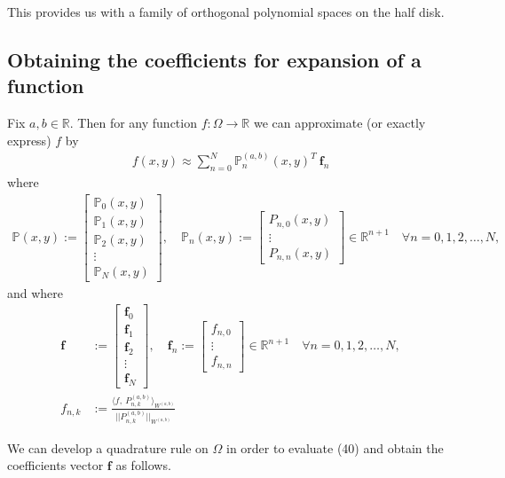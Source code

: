\documentclass[11pt, oneside]{article}   	%
\newcommand{\R}{\mathbb{R}}
\newcommand{\bigP}{\mathbb{P}}
\newcommand{\Pnk}{P_{n,k}}
\begin{document}
This provides us with a family of orthogonal polynomial spaces on the half disk.


\subsection{Obtaining the coefficients for expansion of a function}

Fix \(a,b \in \R\). Then for any function \(f : \Omega \to \R\) we can approximate (or exactly express) \(f\) by
\begin{align}
f(x,y) \approx \sum_{n=0}^N \bigP_n^{(a,b)}(x,y)^T \: \mathbf{f}_n
\end{align}
where
\begin{align}
\bigP(x,y) := \begin{bmatrix}
		\bigP_0(x,y) \\
		\hline
		\bigP_1(x,y) \\
		\hline
		\bigP_2(x,y) \\
		\hline
		\vdots \\
		\hline
		\bigP_N(x,y)
	\end{bmatrix},
\quad
\bigP_n(x,y) := \begin{bmatrix}
		P_{n,0}(x,y) \\
		\vdots \\
		P_{n,n}(x,y)
	\end{bmatrix} \in \R^{n+1} \quad \forall n = 0,1,2,\dots,N,
\end{align}
and where
\begin{align}
\mathbf{f} &:= \begin{bmatrix}
		\mathbf{f}_0 \\
		\hline
		\mathbf{f}_1 \\
		\hline
		\mathbf{f}_2\\
		\hline
		\vdots \\
		\hline
		\mathbf{f}_N
	\end{bmatrix},
\quad
\mathbf{f}_n := \begin{bmatrix}
		f_{n,0} \\
		\vdots \\
		f_{n,n}
	\end{bmatrix} \in \R^{n+1} \quad \forall n = 0,1,2,\dots,N, \\
f_{n,k} &:= \frac{\langle f, \: \Pnk^{(a,b)} \rangle_{W^{(a,b)}}}{|| \Pnk^{(a,b)} ||_{W^{(a,b)}}}
\end{align}




We can develop a quadrature rule on \(\Omega\) in order to evaluate (40) and obtain the coefficients vector \(\mathbf{f}\) as follows. 
\end{document}
